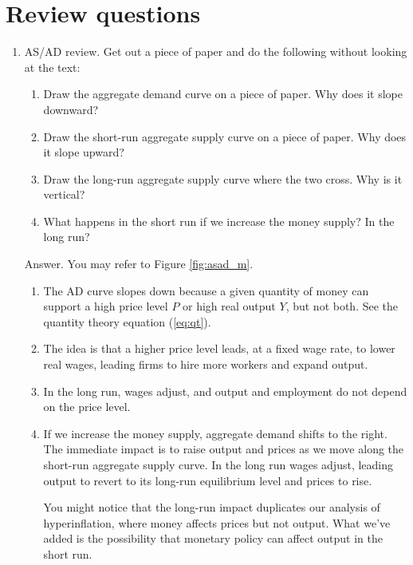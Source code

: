 \section*{Review questions}

\begin{enumerate}
\item AS/AD review.  Get out a piece of paper and do the following
without looking at the text:
\begin{enumerate}
\item Draw the aggregate demand
 curve on a piece of paper.
Why does it slope downward?
\item Draw the short-run aggregate supply
 curve on a piece of paper.
Why does it slope upward?
\item Draw the long-run aggregate supply
 curve where the two cross.
Why is it vertical?
\item What happens in the short run if we increase the money supply?
In the long run?
\end{enumerate}

Answer. You may refer to Figure \ref{fig:asad_m}.
\begin{enumerate}
\item The AD curve slopes down because a given quantity of money
can support
a high price level $P$ or high real output $Y$, but not both.
See the quantity theory equation (\ref{eq:qt}).
\item The idea is that a higher price level leads, at a fixed wage rate,
to lower real wages, leading firms to hire more workers and expand output.
\item In the long run, wages adjust, and output and employment do not depend
on the price level.
\item If we increase the money supply, aggregate demand
 shifts to the right.
The immediate impact is to raise output and prices as we move along
the short-run aggregate supply
 curve.
In the long run wages adjust, leading output to revert to its long-run equilibrium
level and prices to rise.

You might notice that the long-run impact duplicates our analysis of hyperinflation,
where money affects prices but not output.
What we've added is the possibility that monetary policy can affect
output in the short run.
\end{enumerate}


\end{enumerate}
